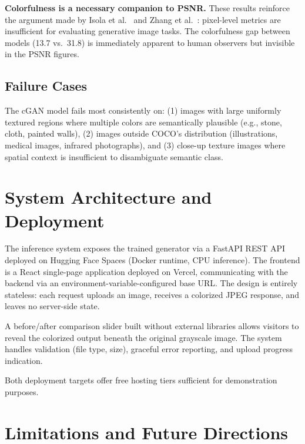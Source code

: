 \documentclass[11pt,a4paper]{article}
\begin{document}
\textbf{Colorfulness is a necessary companion to PSNR.} These results
reinforce the argument made by Isola et al.~\cite{isola2017pix2pix} and
Zhang et al.~\cite{zhang2016colorization}: pixel-level metrics are insufficient
for evaluating generative image tasks. The colorfulness gap between models
(13.7 vs.\ 31.8) is immediately apparent to human observers but invisible
in the PSNR figures.

\subsection{Failure Cases}

The cGAN model fails most consistently on:
(1) images with large uniformly textured regions where multiple colors are
semantically plausible (e.g., stone, cloth, painted walls),
(2) images outside COCO's distribution (illustrations, medical images,
infrared photographs), and
(3) close-up texture images where spatial context is insufficient to disambiguate
semantic class.

\section{System Architecture and Deployment}

The inference system exposes the trained generator via a FastAPI REST API
deployed on Hugging Face Spaces (Docker runtime, CPU inference). The frontend
is a React single-page application deployed on Vercel, communicating with the
backend via an environment-variable-configured base URL. The design is entirely
stateless: each request uploads an image, receives a colorized JPEG response,
and leaves no server-side state.

A before/after comparison slider built without external libraries allows visitors
to reveal the colorized output beneath the original grayscale image.
The system handles validation (file type, size), graceful error reporting, and
upload progress indication.

Both deployment targets offer free hosting tiers sufficient for demonstration
purposes.

\section{Limitations and Future Directions}
\end{document}
